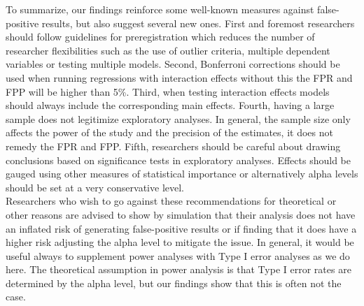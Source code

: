 To summarize, our findings reinforce some well-known measures against false-positive results, but also suggest several new ones. First and foremost researchers should follow guidelines for preregistration \citep{Nosek2015,VANTVEER20162} which reduces the number of researcher flexibilities such as the use of outlier criteria, multiple dependent variables or testing multiple models. Second, Bonferroni corrections should be used when running regressions with interaction effects without this the FPR and FPP will be higher than 5\%. Third, when testing interaction effects models should always include the corresponding main effects. Fourth, having a large sample does not legitimize exploratory analyses. In general, the sample size only affects the power of the study and the precision of the estimates, it does not remedy the FPR and FPP. Fifth, researchers should be careful about drawing conclusions based on significance tests in exploratory analyses. Effects should be gauged using other measures of statistical importance or alternatively alpha levels should be set at a very conservative level. \\
Researchers who wish to go against these recommendations for theoretical or other reasons are advised to show by simulation that their analysis does not have an inflated risk of generating false-positive results or if finding that it does have a higher risk adjusting the alpha level to mitigate the issue. In general, it would be useful always to supplement power analyses with Type I error analyses as we do here. The theoretical assumption in power analysis is that Type I error rates are determined by the alpha level, but our findings show that this is often not the case.




 
